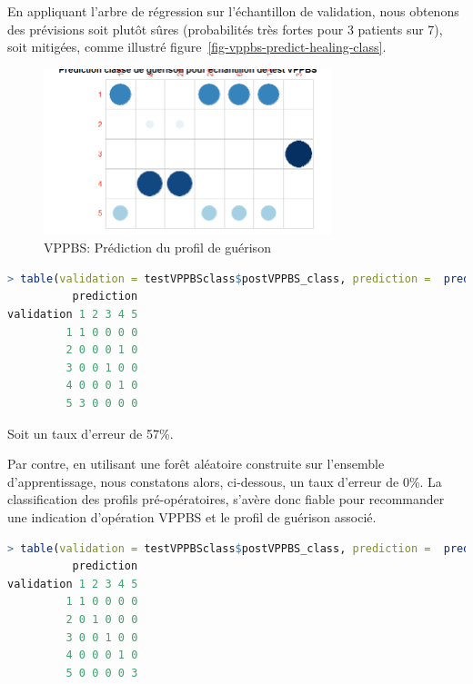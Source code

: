 En appliquant l'arbre de régression sur l'échantillon de validation, nous obtenons des prévisions soit plutôt sûres (probabilités très fortes pour 3 patients sur 7), soit mitigées, comme illustré figure~\ref{fig-vppbs-predict-healing-class}.

\begin{figure}[H]
\centering
\includegraphics[width=0.75\textwidth]{../Fig/VPPBS/vppbs-predict-healing-class.png}
\caption{VPPBS: Prédiction du profil de guérison}
\label{fig-vppbs-regtree-predict-ipss12}
\end{figure}

\begin{lstlisting}[language=R]
> table(validation = testVPPBSclass$postVPPBS_class, prediction =  predict(dt, testVPPBSclass, type="class"))
          prediction
validation 1 2 3 4 5
         1 1 0 0 0 0
         2 0 0 0 1 0
         3 0 0 1 0 0
         4 0 0 0 1 0
         5 3 0 0 0 0
\end{lstlisting}
Soit un taux d'erreur de 57\%.

Par contre, en utilisant une forêt aléatoire construite sur l'ensemble d'apprentissage, nous constatons alors, ci-dessous, un taux d'erreur de 0\%. La classification des profils pré-opératoires, s'avère donc fiable pour recommander une indication d'opération VPPBS et le profil de guérison associé.

\begin{lstlisting}[language=R]
> table(validation = testVPPBSclass$postVPPBS_class, prediction =  predict(rf, testVPPBSclass))
          prediction
validation 1 2 3 4 5
         1 1 0 0 0 0
         2 0 1 0 0 0
         3 0 0 1 0 0
         4 0 0 0 1 0
         5 0 0 0 0 3
\end{lstlisting}

